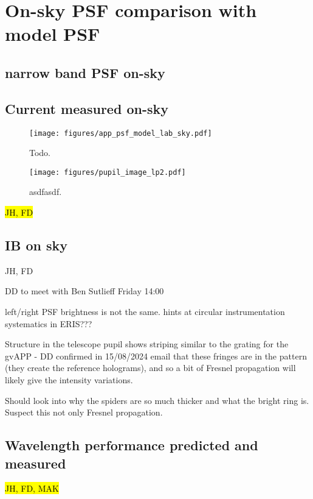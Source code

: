 \documentclass{aa}
\begin{document}
\section{On-sky PSF comparison with model PSF}


\subsection{narrow band PSF on-sky}

\subsection{Current measured on-sky}

\begin{figure*}
    \centering
    \texttt{[image: figures/app\_psf\_model\_lab\_sky.pdf]}
    \caption{Todo.}
    \label{fig:app_psf_comp}
\end{figure*}

\begin{figure}
    \centering
    \texttt{[image: figures/pupil\_image\_lp2.pdf]}
    \caption{asdfasdf.}
    \label{fig:lprime_cc}
\end{figure}

\hl{JH, FD}

\subsection{IB on sky}

JH, FD

DD to meet with Ben Sutlieff Friday 14:00

left/right PSF brightness is not the same. hints at circular instrumentation systematics in ERIS???

Structure in the telescope pupil shows striping similar to the grating for the gvAPP - DD confirmed in 15/08/2024 email that these fringes are in the pattern (they create the reference holograms), and so a bit of Fresnel propagation will likely give the intensity variations.

Should look into why the spiders are so much thicker and what the bright ring is. Suspect this not only Fresnel propagation.

\subsection{Wavelength performance predicted and measured}
\hl{JH, FD, MAK}
\end{document}
